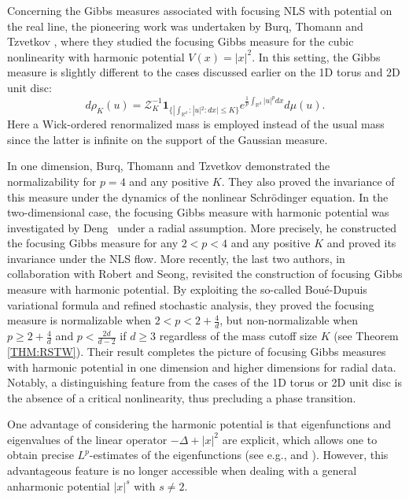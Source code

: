 \documentclass[%
11pt,  reqno]{amsart}
\theoremstyle{remarkstyle}
\newcommand{\1}{\hspace{0.2mm}\text{I}\hspace{0.2mm}}
\newcommand{\ind}{\mathbf 1}
\numberwithin{equation}{section}
\numberwithin{theorem}{section}
\begin{document}
	Concerning the Gibbs measures associated with focusing NLS with potential on the real line, the pioneering work was undertaken by Burq, Thomann and Tzvetkov \cite{BTTz13}, where they studied the focusing Gibbs measure for the cubic nonlinearity with harmonic potential $V(x)=|x|^2$. In this setting, the Gibbs measure is slightly different to the cases discussed earlier on the 1D torus and 2D unit disc:
	$$
	d\rho_K(u) = \mathcal Z^{-1}_K \ind_{\{| \int_{\mathbb R^d} :|u|^2: dx | \leq K \}} e^{\frac{1}{p} \int_{\mathbb R^d} |u|^p dx} d\mu(u).
	$$
	Here a Wick-ordered renormalized mass is employed instead of the usual mass since the latter is infinite on the support of the Gaussian measure. 
	
	In one dimension, Burq, Thomann and Tzvetkov \cite{BTTz13} demonstrated the normalizability for $p=4$ and any positive $K$. They also proved the invariance of this measure under the dynamics of the nonlinear Schr\"odinger equation. In the two-dimensional case, the focusing Gibbs measure with harmonic potential was investigated by Deng~\cite{Deng12} under a radial assumption. More precisely, he constructed the focusing Gibbs measure for any $2<p<4$ and any positive $K$ and proved its invariance under the NLS flow. More recently, the last two authors, in collaboration with Robert and Seong, revisited the construction of focusing Gibbs measure with harmonic potential. By exploiting the so-called Bou\'e-Dupuis variational formula and refined stochastic analysis, they proved the focusing measure is normalizable when $2<p<2+\frac{4}{d}$, but non-normalizable when $p\geq 2+\frac{4}{d}$ and $p<\frac{2d}{d-2}$ if $d\geq 3$ regardless of the mass cutoff size $K$ (see Theorem \ref{THM:RSTW}). Their result completes the picture of focusing Gibbs measures with harmonic potential in one dimension and higher dimensions for radial data.  Notably, a distinguishing feature from the cases of the 1D torus or 2D unit disc is the absence of a critical nonlinearity, thus precluding a phase transition. 
	
	One advantage of considering the harmonic potential is that eigenfunctions and eigenvalues of the linear operator $-\Delta +|x|^2$ are explicit, which allows one to obtain precise $L^p$-estimates of the eigenfunctions (see e.g., \cite{KT05} and \cite{IRT16}). However, this advantageous feature is no longer accessible when dealing with a general anharmonic potential $|x|^s$ with $s \ne 2$.
	
\end{document}
